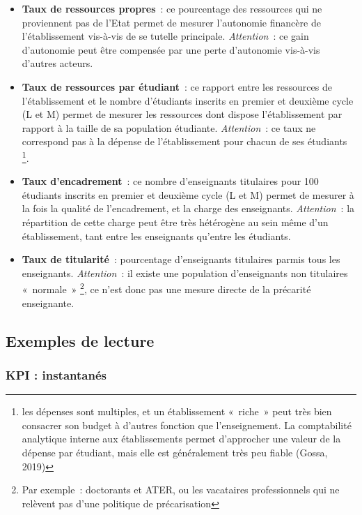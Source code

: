 \documentclass[12pt,french,]{article}
\providecommand{\tightlist}{%
  \setlength{\itemsep}{0pt}\setlength{\parskip}{0pt}}
\begin{document}
\begin{itemize}
\tightlist
\item
  \textbf{Taux de ressources propres}~: ce pourcentage des ressources
  qui ne proviennent pas de l'Etat permet de mesurer l'autonomie
  financère de l'établissement vis-à-vis de se tutelle principale.
  \emph{Attention}~: ce gain d'autonomie peut être compensée par une
  perte d'autonomie vis-à-vis d'autres acteurs.
\item
  \textbf{Taux de ressources par étudiant}~: ce rapport entre les
  ressources de l'établissement et le nombre d'étudiants inscrits en
  premier et deuxième cycle (L et M) permet de mesurer les ressources
  dont dispose l'établissement par rapport à la taille de sa population
  étudiante. \emph{Attention}~: ce taux ne correspond pas à la dépense
  de l'établissement pour chacun de ses étudiants \footnote{les dépenses
    sont multiples, et un établissement «~riche~» peut très bien
    consacrer son budget à d'autres fonction que l'enseignement. La
    comptabilité analytique interne aux établissements permet
    d'approcher une valeur de la dépense par étudiant, mais elle est
    généralement très peu fiable (Gossa, 2019)}.
\item
  \textbf{Taux d'encadrement}~: ce nombre d'enseignants titulaires pour
  100 étudiants inscrits en premier et deuxième cycle (L et M) permet de
  mesurer à la fois la qualité de l'encadrement, et la charge des
  enseignants. \emph{Attention}~: la répartition de cette charge peut
  être très hétérogène au sein même d'un établissement, tant entre les
  enseignants qu'entre les étudiants.
\item
  \textbf{Taux de titularité}~: pourcentage d'enseignants titulaires
  parmis tous les enseignants. \emph{Attention}~: il existe une
  population d'enseignants non titulaires «~normale~» \footnote{Par
    exemple~: doctorants et ATER, ou les vacataires professionnels qui
    ne relèvent pas d'une politique de précarisation}, ce n'est donc pas
  une mesure directe de la précarité enseignante.
\end{itemize}

\hypertarget{exemples-de-lecture}{%
\subsection{Exemples de lecture}\label{exemples-de-lecture}}

\hypertarget{kpi-instantanuxe9s}{%
\subsubsection{KPI : instantanés}\label{kpi-instantanuxe9s}}
\end{document}
